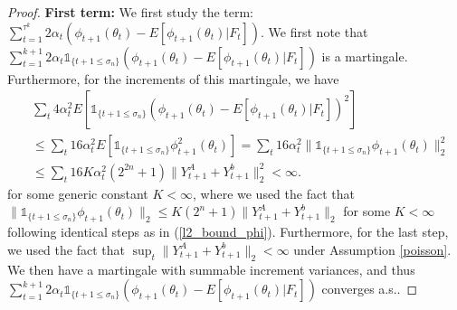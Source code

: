 \documentclass[11pt]{article}
\begin{document}
\begin{proof}
{\bf First term:} We first study the term: $\sum_{t=1}^{\tau^k} 2\alpha_t \left(\phi_{t+1}(\theta_t)-E[\phi_{t+1}(\theta_t)|F_t]\right)$. We first note that  $\sum_{t=1}^{k+1} 2\alpha_t  \mathds{1}_{\{t+1\leq \sigma_n\}} \left(\phi_{t+1}(\theta_t)-E[\phi_{t+1}(\theta_t)|F_t]\right)$ is a martingale.
Furthermore, for the increments of this martingale, we have
\begin{align*}
&\sum_t 4\alpha^2_t  E\left[ \mathds{1}_{\{t+1\leq \sigma_n\}}\left(\phi_{t+1}(\theta_t)-E[\phi_{t+1}(\theta_t)|F_t]\right)^2 \right]  \\
&\leq  \sum_t 16\alpha_t^2 E[  \mathds{1}_{\{t+1\leq \sigma_n\}}\phi^2_{t+1}(\theta_t)]=   \sum_t 16\alpha_t^2 \|\mathds{1}_{\{t+1\leq \sigma_n\}}\phi_{t+1}(\theta_t)\|_2^2  \\
& \leq \sum_t 16 K \alpha_t^2 (2^{2n}+1)\|Y^A_{t+1} + Y^b_{t+1}\|^2_2<\infty.
\end{align*}
for some generic constant $K<\infty$, where we used the fact that $\| \mathds{1}_{\{t+1\leq \sigma_n\}}\phi_{t+1}(\theta_t)\|_2 \leq K(2^n+1)\|Y^A_{t+1} + Y^b_{t+1}\|_2$ for some $K<\infty$ following identical steps as in (\ref{l2_bound_phi}).  Furthermore, for the last step, we used the fact that $\sup_t\|Y^A_{t+1} + Y^b_{t+1}\|_2<\infty$ under Assumption \ref{poisson}. We then have a martingale with summable increment variances, and thus    $\sum_{t=1}^{k+1} 2\alpha_t  \mathds{1}_{\{t+1\leq \sigma_n\}} \left(\phi_{t+1}(\theta_t)-E[\phi_{t+1}(\theta_t)|F_t]\right)$ converges a.s..




\end{proof}
\end{document}
